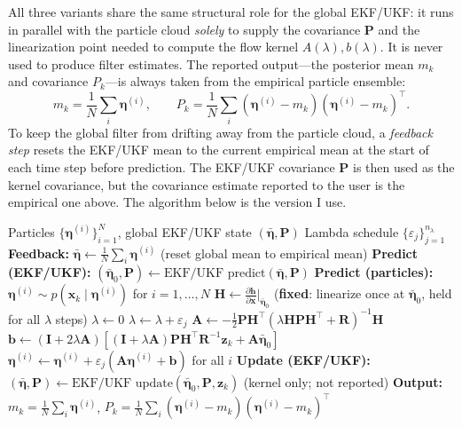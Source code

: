 \documentclass{article}
\begin{document}
All three variants share the same structural role for the global EKF/UKF: it runs in parallel with the particle cloud \textit{solely} to supply the covariance $\mathbf{P}$ and the linearization point needed to compute the flow kernel $A(\lambda), b(\lambda)$. It is never used to produce filter estimates. The reported output—the posterior mean $m_k$ and covariance $P_k$—is always taken from the empirical particle ensemble:
\begin{equation}
    m_k = \frac{1}{N}\sum_i \boldsymbol{\eta}^{(i)}, \qquad P_k = \frac{1}{N}\sum_i (\boldsymbol{\eta}^{(i)} - m_k)(\boldsymbol{\eta}^{(i)} - m_k)^\top.
\end{equation}
To keep the global filter from drifting away from the particle cloud, a \textit{feedback step} resets the EKF/UKF mean to the current empirical mean at the start of each time step before prediction. The EKF/UKF covariance $\mathbf{P}$ is then used as the kernel covariance, but the covariance estimate reported to the user is the empirical one above. The algorithm below is the version I use.

\begin{algorithm}[H]
\caption{EDH Flow Filter (Fixed Global Linearization)}
\label{alg:edh_fixed}
\begin{algorithmic}[1]
\REQUIRE Particles $\{\boldsymbol{\eta}^{(i)}\}_{i=1}^N$, global EKF/UKF state $(\bar{\boldsymbol{\eta}}, \mathbf{P})$
\REQUIRE Lambda schedule $\{\varepsilon_j\}_{j=1}^{n_\lambda}$
  \STATE \textbf{Feedback:} $\bar{\boldsymbol{\eta}} \leftarrow \frac{1}{N}\sum_i \boldsymbol{\eta}^{(i)}$ \hfill (reset global mean to empirical mean)
  \STATE \textbf{Predict (EKF/UKF):} $(\bar{\boldsymbol{\eta}}_0, \mathbf{P}) \leftarrow \text{EKF/UKF predict}(\bar{\boldsymbol{\eta}}, \mathbf{P})$
  \STATE \textbf{Predict (particles):} $\boldsymbol{\eta}^{(i)} \sim p(\mathbf{x}_k \mid \boldsymbol{\eta}^{(i)})$ for $i=1,\ldots,N$
  \STATE $\mathbf{H} \leftarrow \frac{\partial \mathbf{h}}{\partial \mathbf{x}}\Big|_{\bar{\boldsymbol{\eta}}_0}$ \hfill (\textbf{fixed}: linearize once at $\bar{\boldsymbol{\eta}}_0$, held for all $\lambda$ steps)
  \STATE $\lambda \leftarrow 0$
    \STATE $\lambda \leftarrow \lambda + \varepsilon_j$
    \STATE $\mathbf{A} \leftarrow -\tfrac{1}{2}\mathbf{P}\mathbf{H}^\top(\lambda\mathbf{H}\mathbf{P}\mathbf{H}^\top + \mathbf{R})^{-1}\mathbf{H}$
    \STATE $\mathbf{b} \leftarrow (\mathbf{I}+2\lambda\mathbf{A})[(\mathbf{I}+\lambda\mathbf{A})\mathbf{P}\mathbf{H}^\top\mathbf{R}^{-1}\mathbf{z}_k + \mathbf{A}\bar{\boldsymbol{\eta}}_0]$
    \STATE $\boldsymbol{\eta}^{(i)} \leftarrow \boldsymbol{\eta}^{(i)} + \varepsilon_j(\mathbf{A}\boldsymbol{\eta}^{(i)} + \mathbf{b})$ for all $i$
  \ENDFOR
  \STATE \textbf{Update (EKF/UKF):} $(\bar{\boldsymbol{\eta}}, \mathbf{P}) \leftarrow \text{EKF/UKF update}(\bar{\boldsymbol{\eta}}_0, \mathbf{P}, \mathbf{z}_k)$ \hfill (kernel only; not reported)
  \STATE \textbf{Output:} $m_k = \frac{1}{N}\sum_i \boldsymbol{\eta}^{(i)}$, \; $P_k = \frac{1}{N}\sum_i(\boldsymbol{\eta}^{(i)}-m_k)(\boldsymbol{\eta}^{(i)}-m_k)^\top$
\ENDFOR
\end{algorithmic}
\end{algorithm}
\end{document}
